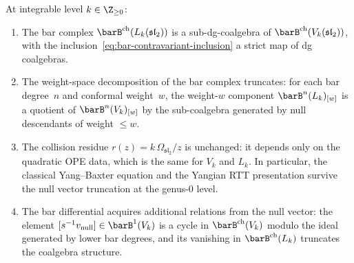\begin{proposition}
\label{prop:null-truncation}
At integrable level $k \in \Z_{\ge 0}$:
\begin{enumerate}[label=\textup{(\roman*)},nosep]
\item The bar complex $\barB^{\mathrm{ch}}(L_k(\mathfrak{sl}_2))$
 is a sub-dg-coalgebra of\/
 $\barB^{\mathrm{ch}}(V_k(\mathfrak{sl}_2))$, with the
 inclusion~\eqref{eq:bar-contravariant-inclusion} a strict map
 of dg coalgebras.
\item The weight-space decomposition of the bar complex
 truncates: for each bar degree~$n$ and conformal weight~$w$,
 the weight-$w$ component
 $\barB^n(L_k)_{[w]}$ is a quotient of
 $\barB^n(V_k)_{[w]}$ by the sub-coalgebra generated by
 null descendants of weight $\le w$.
\item The collision residue $r(z) = k\,\Omega_{\mathfrak{sl}_2}/z$
 is unchanged: it depends only on the quadratic OPE data,
 which is the same for $V_k$ and $L_k$. In particular, the
 classical Yang--Baxter equation and the Yangian RTT
 presentation survive the null vector truncation at the
 genus-$0$ level.
\item The bar differential acquires additional relations from the
 null vector: the element
 $[s^{-1} v_{\mathrm{null}}] \in \barB^1(V_k)$ is a cycle in
 $\barB^{\mathrm{ch}}(V_k)$ modulo the ideal generated by lower
 bar degrees, and its vanishing in $\barB^{\mathrm{ch}}(L_k)$
 truncates the coalgebra structure.
\end{enumerate}
\end{proposition}

